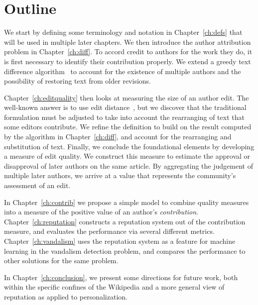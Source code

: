 \section{Outline}

We start by defining some terminology and notation in Chapter~\ref{ch:defs}
that will be used in multiple later chapters.
We then introduce the author attribution problem in Chapter~\ref{ch:diff}.
To accord credit to authors for the work they do,
it is first necessary to identify their contribution properly.
We extend a greedy text difference algorithm~\cite{Reichenberger1991,Burns1997} to
account for the existence of multiple authors and the possibility
of restoring text from older revisions.

Chapter~\ref{ch:editquality} then looks at measuring the size of
an author edit.
The well-known answer is to use edit distance~\cite{Levenshtein1966},
but we discover that the traditional formulation must be adjusted
to take into account the rearranging of text that some editors contribute.
We refine the definition to build on the result computed by the
algorithm in Chapter~\ref{ch:diff}, and account for the rearranging
and substitution of text.
Finally, we conclude the foundational elements by developing a measure
of edit quality.
We construct this measure to estimate the approval or disapproval of
later authors on the same article.
By aggregating the judgement of multiple later authors, we arrive at
a value that represents the community's assessment of an edit.

In Chapter~\ref{ch:contrib} we propose a simple model to combine
quality measures into a measure of the positive value of an author's \textit{contribution}.
Chapter~\ref{ch:reputation} constructs a reputation system
out of the contribution measure, and evaluates the performance
via several different metrics.
Chapter~\ref{ch:vandalism} uses the reputation system as a feature
for machine learning in the vandalism detection problem, and compares
the performance to other solutions for the same problem.

In Chapter~\ref{ch:conclusion}, we present some directions for future
work, both within the specific confines of the Wikipedia and a more
general view of reputation as applied to personalization.

